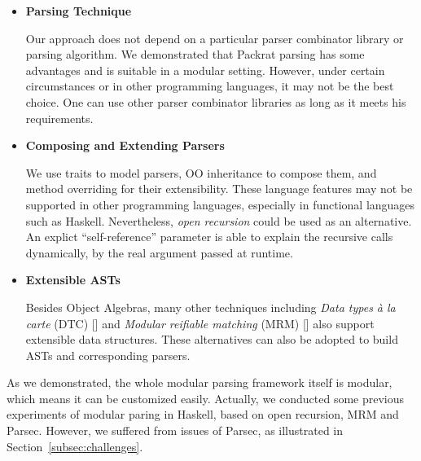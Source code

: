 \begin{itemize}

\item {\bf Parsing Technique}

Our approach does not depend on a particular parser combinator library or parsing algorithm. We demonstrated that Packrat parsing has some advantages and is suitable in a modular setting. However, under certain circumstances or in other programming languages, it may not be the best choice. One can use other parser combinator libraries as long as it meets his requirements.

\item {\bf Composing and Extending Parsers}

We use traits to model parsers, OO inheritance to compose them, and method overriding for their extensibility. These language features may not be supported in other programming languages, especially in functional languages such as Haskell. Nevertheless, \textit{open recursion} could be used as an alternative. An explict ``self-reference'' parameter is able to explain the recursive calls dynamically, by the real argument passed at runtime.

\item {\bf Extensible ASTs}

Besides Object Algebras, many other techniques including \textit{Data types à la carte} (DTC) [] and \textit{Modular reifiable matching} (MRM) [] also support extensible data structures. These alternatives can also be adopted to build ASTs and corresponding parsers.

\end{itemize}

As we demonstrated, the whole modular parsing framework itself is modular, which means it can be customized easily. Actually, we conducted some previous experiments of modular paring in Haskell, based on open recursion, MRM and Parsec. However, we suffered from issues of Parsec, as illustrated in Section~\ref{subsec:challenges}.
